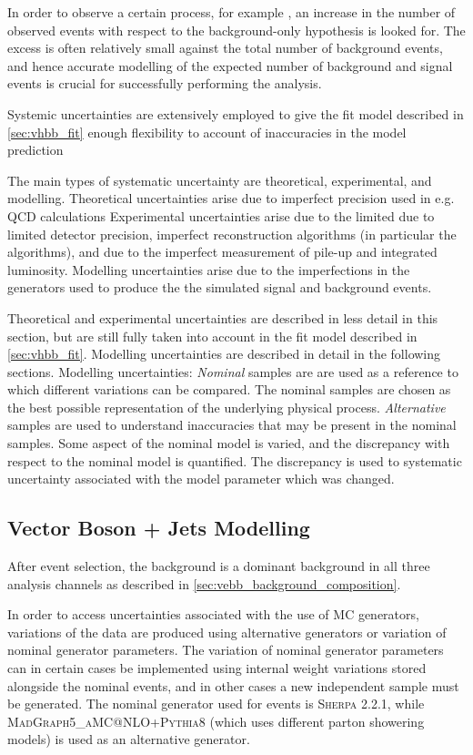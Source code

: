 In order to observe a certain process, for example \VHbb, an increase in the number of observed events with respect to the background-only hypothesis is looked for.
The excess is often relatively small against the total number of background events, and hence accurate modelling of the expected number of background and signal events is crucial for successfully performing the analysis.

Systemic uncertainties are extensively employed to give the fit model described in \cref{sec:vhbb_fit} enough flexibility to account of inaccuracies in the model prediction

The main types of systematic uncertainty are theoretical, experimental, and modelling.
Theoretical uncertainties arise due to imperfect precision used in e.g. QCD calculations
Experimental uncertainties arise due to the limited due to limited detector precision, imperfect reconstruction algorithms (in particular the \btagging algorithms), and due to the imperfect measurement of pile-up and integrated luminosity.
Modelling uncertainties arise due to the imperfections in the generators used to produce the the simulated signal and background events.

Theoretical and experimental uncertainties are described in less detail in this section, but are still fully taken into account in the fit model described in \cref{sec:vhbb_fit}.
Modelling uncertainties are described in detail in the following sections.
Modelling uncertainties:
\textit{Nominal} samples are are used as a reference to which different variations can be compared.
The nominal samples are chosen as the best possible representation of the underlying physical process.
\textit{Alternative} samples are used to understand inaccuracies that may be present in the nominal samples.
Some aspect of the nominal model is varied, and the discrepancy with respect to the nominal model is quantified.
The discrepancy is used to systematic uncertainty associated with the model parameter which was changed.


\subsection{Vector Boson + Jets Modelling}

After event selection, the \Vjets background is a dominant background in all three analysis channels as described in \cref{sec:vebb_background_composition}.

In order to access uncertainties associated with the use of MC generators, variations of the data are produced using alternative generators or variation of nominal generator parameters.
The variation of nominal generator parameters can in certain cases be implemented using internal weight variations stored alongside the nominal events, and in other cases a new independent sample must be generated. The nominal generator used for \Vjets events is \textsc{Sherpa 2.2.1}, while \textsc{MadGraph5\_aMC@NLO+Pythia8} (which uses different parton showering models) is used as an alternative generator.

